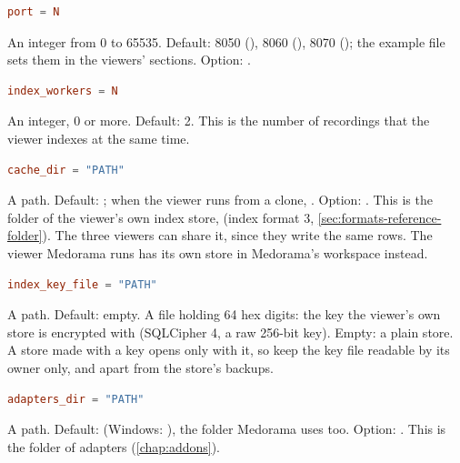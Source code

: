 \begin{lstlisting}[style=signature,language=TOML]
port = N
\end{lstlisting}
An integer from 0 to 65535. Default: 8050 (), 8060 (),
8070 (); the example file sets them in the viewers' sections. Option:
.

\begin{lstlisting}[style=signature,language=TOML]
index_workers = N
\end{lstlisting}
An integer, 0 or more. Default: 2. This is the number of recordings that the viewer indexes at
the same time.

\begin{lstlisting}[style=signature,language=TOML]
cache_dir = "PATH"
\end{lstlisting}
A path. Default: ; when the viewer runs from a clone,
. Option: . This is the
folder of the viewer's own index store,  (index format 3,
\cref{sec:formats-reference-folder}). The three viewers can share it, since they write the same
rows. The viewer Medorama runs has its own store in Medorama's workspace instead.

\begin{lstlisting}[style=signature,language=TOML]
index_key_file = "PATH"
\end{lstlisting}
A path. Default: empty. A file holding 64 hex digits: the key the viewer's own store is encrypted
with (SQLCipher 4, a raw 256-bit key). Empty: a plain store. A store made with a key opens only
with it, so keep the key file readable by its owner only, and apart from the store's backups.

\begin{lstlisting}[style=signature,language=TOML]
adapters_dir = "PATH"
\end{lstlisting}
A path. Default:  (Windows:
), the folder Medorama uses
too. Option: . This is the
folder of adapters (\cref{chap:addons}).

